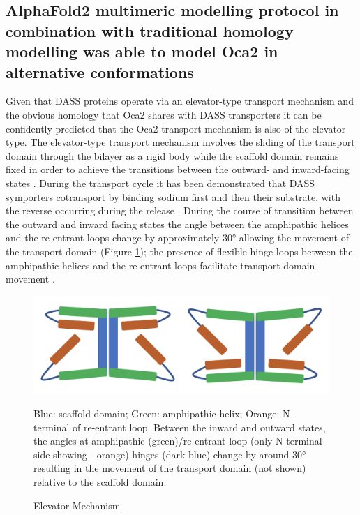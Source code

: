 \subsection{AlphaFold2 multimeric modelling protocol in combination with traditional homology modelling was able to model Oca2 in alternative conformations}

Given that DASS proteins operate via an elevator-type transport mechanism \cite{drew2016shared} and the obvious  homology that Oca2 shares with DASS transporters it can be confidently predicted that the Oca2 transport mechanism is also of the elevator type. The elevator-type transport mechanism involves the sliding of the transport domain through the bilayer as a rigid body while the scaffold domain remains fixed in order to achieve the transitions between the outward- and inward-facing states \cite{garaeva2020elevator}. During the transport cycle it has been demonstrated that DASS symporters cotransport by binding sodium first and then their substrate, with the reverse occurring during the release \cite{hall2005functional,mulligan2014functional,pajor2013functional,wright1983kinetics,yao2000transport}. During the course of transition between the outward and inward facing states the angle between the amphipathic helices and the re-entrant loops change by approximately 30° allowing the movement of the transport domain (Figure \ref{fig:oca2_8});  the presence of flexible hinge loops between the amphipathic helices and the re-entrant loops facilitate transport domain movement \cite{sauer2021structure}.

 \begin{figure}[th!]
    \centering
    \includegraphics[width=150mm, scale=0.75]{oca2/oca2_8.png}
    \caption{Elevator Mechanism}
    \label{fig:oca2_8}
    \small
    Blue: scaffold domain; Green: amphipathic helix; Orange: N- terminal of re-entrant loop.  Between the inward and outward states, the angles at amphipathic (green)/re-entrant loop (only N-terminal side showing - orange) hinges (dark blue) change by around 30° resulting in the movement of the transport domain (not shown) relative to the scaffold domain.
\end{figure}



